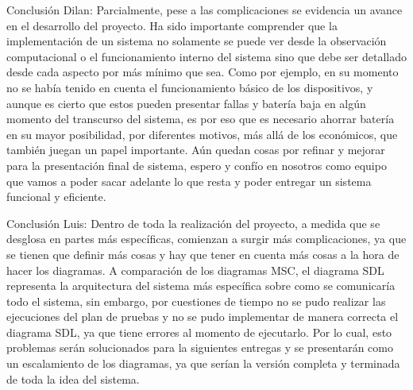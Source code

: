 
\begin{comment}
Este ítem hace explícita la importancia de reflexionar sobre el proceso de diseño (qué sucedió sin contratiempos, qué fue sorpresivo, qué podría ser mejor). \\

Aquí es importante que se consignen las reflexiones y lecciones aprendidas no sólo desde lo disciplinar, sino también sobre el posible impacto que podría tener la Ingeniería de Sistemas y Computación (desde la perspectiva del proyecto desarrollado este semestre) sobre la sociedad. \\

Debe contener la reflexión de cada uno de los miembros del equipo y también debe haber al menos una reflexión grupal consensuada adicional.
\end{comment}
Conclusión Dilan: Parcialmente, pese a las complicaciones se evidencia un avance en el desarrollo del proyecto. Ha sido importante comprender que la implementación de un sistema no solamente se puede ver desde la observación computacional o el funcionamiento interno del sistema sino que debe ser detallado desde cada aspecto por más mínimo que sea. Como por ejemplo, en su momento no se había tenido en cuenta el funcionamiento básico de los dispositivos, y aunque es cierto que estos pueden presentar fallas y batería baja en algún momento del transcurso del sistema, es por eso que es necesario ahorrar batería en su mayor posibilidad, por diferentes motivos, más allá de los económicos, que también juegan un papel importante. Aún quedan cosas por refinar y mejorar para la presentación final de sistema, espero y confío en nosotros como equipo que vamos a poder sacar adelante lo que resta y poder entregar un sistema funcional y eficiente.
\newline

Conclusión Luis: Dentro de toda la realización del proyecto, a medida que se desglosa en partes más específicas, comienzan a surgir más complicaciones, ya que se tienen que definir más cosas y hay que tener en cuenta más cosas a la hora de hacer los diagramas. A comparación de los diagramas MSC, el diagrama SDL representa la arquitectura del sistema más específica sobre como se comunicaría todo el sistema, sin embargo, por cuestiones de tiempo no se pudo realizar las ejecuciones del plan de pruebas y no se pudo implementar de manera correcta el diagrama SDL, ya que tiene errores al momento de ejecutarlo. Por lo cual, esto problemas serán solucionados para la siguientes entregas y se presentarán como un escalamiento de los diagramas, ya que serían la versión completa y terminada de toda la idea del sistema.
\newline

